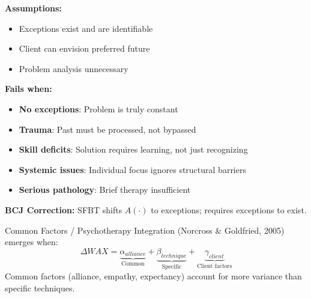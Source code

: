 \begin{tcolorbox}[colback=red!5!white, colframe=red!75!black, title=Boundary Condition: Where SFBT Fails]
\textbf{Assumptions:}
\begin{itemize}[nosep]
\item Exceptions exist and are identifiable
\item Client can envision preferred future
\item Problem analysis unnecessary
\end{itemize}

\textbf{Fails when:}
\begin{itemize}[nosep]
\item \textbf{No exceptions}: Problem is truly constant
\item \textbf{Trauma}: Past must be processed, not bypassed
\item \textbf{Skill deficits}: Solution requires learning, not just recognizing
\item \textbf{Systemic issues}: Individual focus ignores structural barriers
\item \textbf{Serious pathology}: Brief therapy insufficient
\end{itemize}

\textbf{BCJ Correction:} SFBT shifts $A(\cdot)$ to exceptions; requires exceptions to exist.
\end{tcolorbox}


\begin{theorem}
\label{thm:psychotherapy-integration}
Common Factors / Psychotherapy Integration (Norcross \& Goldfried, 2005) emerges when:
\begin{equation}
\boxed{\Delta WAX = \underbrace{\alpha_{alliance}}_{\text{Common}} + \underbrace{\beta_{technique}}_{\text{Specific}} + \underbrace{\gamma_{client}}_{\text{Client factors}}}
\end{equation}
Common factors (alliance, empathy, expectancy) account for more variance than specific techniques.
\end{theorem}

